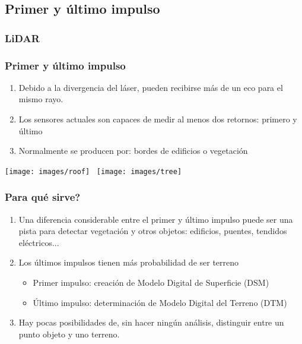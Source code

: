 \subsection{Primer y último impulso}
\begin{frame}
  \frametitle{LiDAR}
    \begin{center}
    \end{center}
\end{frame}
\begin{frame}[label=firstlast1]
    \frametitle{Primer y último impulso}
    \begin{enumerate}
      \item Debido a la divergencia del láser, pueden recibirse \alert{más de un eco} para el mismo rayo.
    	\item Los sensores actuales son capaces de medir al menos dos retornos: \alert{primero} y \alert{último}
    	\item Normalmente se producen por: \alert{bordes} de edificios o \alert{vegetación}
    \end{enumerate}
    \begin{center}
      \texttt{[image: images/roof]}~
      \texttt{[image: images/tree]}
    \end{center}
\end{frame}
\begin{frame}
    \frametitle{\textquestiondown Para qué sirve?}
    \begin{enumerate}
     \item Una diferencia considerable entre el primer y último impulso puede ser una pista para detectar vegetación y otros objetos: edificios, puentes, tendidos eléctricos...
     \item Los últimos impulsos tienen más probabilidad de ser terreno
     	\begin{itemize}
     	   \item Primer impulso: creación de Modelo Digital de Superficie (\alert{DSM})
     	   \item \'Ultimo impulso: determinación de Modelo Digital del Terreno (\alert{DTM})
     	\end{itemize}
     \item Hay pocas posibilidades de, sin hacer ningún análisis, distinguir entre un punto \alert{objeto} y uno \alert{terreno}.
    \end{enumerate}
\end{frame}
